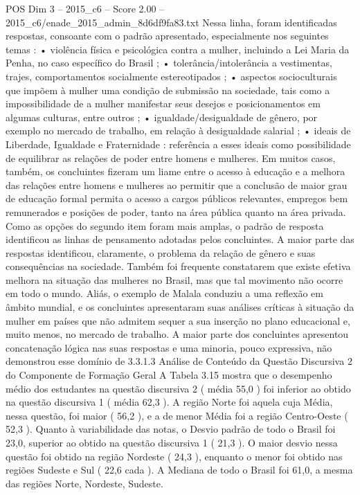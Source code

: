 \begin{textsample}{POS Dim 3 – 2015\_c6 – Score 2.00 – 2015\_c6/enade\_2015\_admin\_8d6df9fa83.txt}
Nessa linha, foram identificadas respostas, consoante com o padrão apresentado, especialmente nos seguintes temas : • violência física e psicológica contra a mulher, incluindo a Lei Maria da Penha, no caso específico do Brasil ; • tolerância/intolerância a vestimentas, trajes, comportamentos socialmente estereotipados ; • aspectos socioculturais que impõem à mulher uma condição de submissão na sociedade, tais como a impossibilidade de a mulher manifestar seus desejos e posicionamentos em algumas culturas, entre outros ; • igualdade/desigualdade de gênero, por exemplo no mercado de trabalho, em relação à desigualdade salarial ; • ideais de Liberdade, Igualdade e Fraternidade : referência a esses ideais como possibilidade de equilibrar as relações de poder entre homens e mulheres.
Em muitos casos, também, os concluintes fizeram um liame entre o acesso à educação e a melhora das relações entre homens e mulheres ao permitir que a conclusão de maior grau de educação formal permita o acesso a cargos públicos relevantes, empregos bem remunerados e posições de poder, tanto na área pública quanto na área privada.
Como as opções do segundo item foram mais amplas, o padrão de resposta identificou as linhas de pensamento adotadas pelos concluintes.
A maior parte das respostas identificou, claramente, o problema da relação de gênero e suas consequências na sociedade.
Também foi frequente constatarem que existe efetiva melhora na situação das mulheres no Brasil, mas que tal movimento não ocorre em todo o mundo.
Aliás, o exemplo de Malala conduziu a uma reflexão em âmbito mundial, e os concluintes apresentaram suas análises críticas à situação da mulher em países que não admitem sequer a sua inserção no plano educacional e, muito menos, no mercado de trabalho.
A maior parte dos concluintes apresentou concatenação lógica nas suas respostas e uma minoria, pouco expressiva, não demonstrou esse domínio de 3.3.1.3 Análise de Conteúdo da Questão Discursiva 2 do Componente de Formação Geral A Tabela 3.15 mostra que o desempenho médio dos estudantes na questão discursiva 2 ( média 55,0 ) foi inferior ao obtido na questão discursiva 1 ( média 62,3 ).
A região Norte foi aquela cuja Média, nessa questão, foi maior ( 56,2 ), e a de menor Média foi a região Centro-Oeste ( 52,3 ).
Quanto à variabilidade das notas, o Desvio padrão de todo o Brasil foi 23,0, superior ao obtido na questão discursiva 1 ( 21,3 ).
O maior desvio nessa questão foi obtido na região Nordeste ( 24,3 ), enquanto o menor foi obtido nas regiões Sudeste e Sul ( 22,6 cada ).
A Mediana de todo o Brasil foi 61,0, a mesma das regiões Norte, Nordeste, Sudeste.

\end{textsample}
